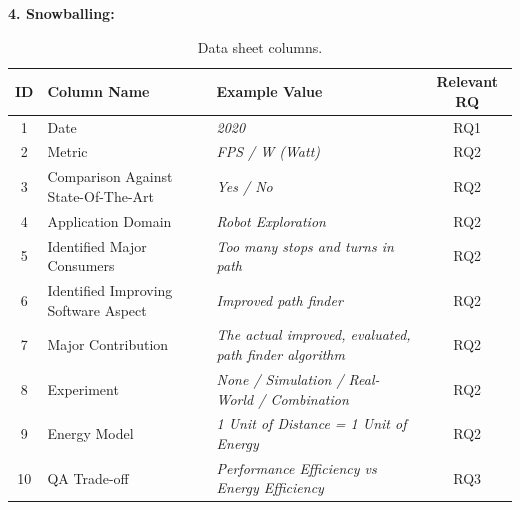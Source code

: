 \noindent\textbf{4. Snowballing:}
\begin{table}[t]
    \centering
    \caption{Data sheet columns.}
    \begin{tabular}{cllc}
        \toprule
            ID &
            Column Name & 
            Example Value & 
            Relevant RQ  \\
        \midrule
            1 &
               Date & 
                \textit{2020} & 
                RQ1 \\

            2 &
                Metric & 
                \textit{FPS / W (Watt)} & 
                RQ2 \\

            3 &
                Comparison Against State-Of-The-Art & 
                \textit{Yes / No} & 
                RQ2 \\
                
            4 &
                Application Domain & 
                \textit{Robot Exploration} & 
                RQ2 \\

            5 & 
                Identified Major Consumers & 
                \textit{Too many stops and turns in path} & 
                RQ2 \\

            6 & 
                Identified Improving Software Aspect & 
                \textit{Improved path finder} & 
                RQ2 \\
            
            7 &
                Major Contribution & 
                \textit{The actual improved, evaluated, path finder algorithm} & 
                RQ2 \\
            
            8 &
                Experiment & 
                \textit{None / Simulation / Real-World / Combination} & 
                RQ2 \\
            
            9 &
                Energy Model &
                \textit{1 Unit of Distance = 1 Unit of Energy} & 
                RQ2 \\
            
            10 &
                QA Trade-off & 
                \textit{Performance Efficiency vs Energy Efficiency} & 
                RQ3 \\
        \bottomrule
    \end{tabular}
    \label{table:data_sheet}
\end{table}
